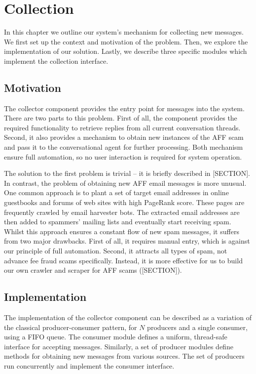 \chapter{Collection}
In this chapter we outline our system's mechanism for collecting new messages. We first set up the context and motivation of the problem. Then, we explore the implementation of our solution. Lastly, we describe three specific modules which implement the collection interface.

\section{Motivation}

The collector component provides the entry point for messages into the system. There are two parts to this problem. First of all, the component provides the required functionality to retrieve replies from all current conversation threads. Second, it also provides a mechanism to obtain new instances of the AFF scam and pass it to the conversational agent for further processing. Both mechanism ensure full automation, so no user interaction is required for system operation.

The solution to the first problem is trivial -- it is briefly described in [SECTION]. In contrast, the problem of obtaining new AFF email messages is more unusual. One common approach is to plant a set of target email addresses in online guestbooks and forums of web sites with high PageRank score. These pages are frequently crawled by email harvester bots. The extracted email addresses are then added to spammers' mailing lists and eventually start receiving spam. Whilst this approach ensures a constant flow of new spam messages, it suffers from two major drawbacks. First of all, it requires manual entry, which is against our principle of full automation. Second, it attracts all types of spam, not advance fee fraud scams specifically. Instead, it is more effective for us to build our own crawler and scraper for AFF scams ([SECTION]).

\section{Implementation}

The implementation of the collector component can be described as a variation of the classical producer-consumer pattern, for $N$ producers and a single consumer, using a FIFO queue. The consumer module defines a uniform, thread-safe interface for accepting messages. Similarly, a set of producer modules define methods for obtaining new messages from various sources. The set of producers run concurrently and implement the consumer interface.

